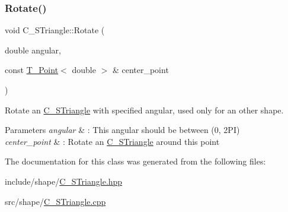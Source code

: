 \subsubsection{\texorpdfstring{Rotate()}{Rotate()}}
{\footnotesize\ttfamily void C\+\_\+\+S\+Triangle\+::\+Rotate (\begin{DoxyParamCaption}\item[{double}]{angular,  }\item[{const \hyperlink{classT__Point}{T\+\_\+\+Point}$<$ double $>$ \&}]{center\+\_\+point }\end{DoxyParamCaption})}



Rotate an \hyperlink{classC__STriangle}{C\+\_\+\+S\+Triangle} with specified angular, used only for an other shape. 


\begin{DoxyParams}{Parameters}
{\em angular} & \+: This angular should be between (0, 2\+PI) \\
\hline
{\em center\+\_\+point} & \+: Rotate an \hyperlink{classC__STriangle}{C\+\_\+\+S\+Triangle} around this point \\
\hline
\end{DoxyParams}


The documentation for this class was generated from the following files\+:\begin{DoxyCompactItemize}
\item 
include/shape/\hyperlink{C__STriangle_8hpp}{C\+\_\+\+S\+Triangle.\+hpp}\item 
src/shape/\hyperlink{C__STriangle_8cpp}{C\+\_\+\+S\+Triangle.\+cpp}\end{DoxyCompactItemize}
